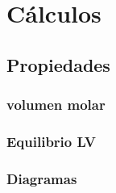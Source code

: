 \chapter{Cálculos}
	



	\section{Propiedades}	
		
		
		

			

		
		
		
		
		
		
		
		
		\subsection{volumen molar}
		\subsection{Equilibrio LV}
		
		
		
		
		
		\subsection{Diagramas}
	
